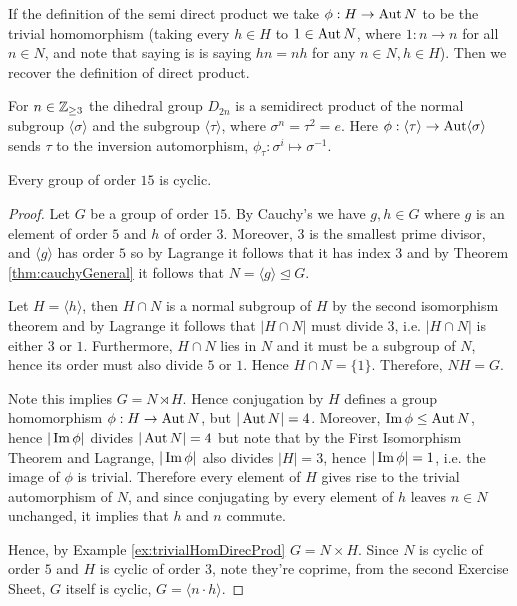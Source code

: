 \begin{example}
  If the definition of the semi direct product we take $\phi:H\to\operatorname{Aut} N$ to be the trivial
  homomorphism (taking every $h\in H$ to $1\in \operatorname{Aut} N$, where $1:n\to n$ for all $n\in
  N$, and note that saying is is saying $hn=nh$ for any $n\in N, h\in H$). Then we recover
  the definition of direct product.
  \label{ex:trivialHomDirecProd}
\end{example}

\begin{example}
  For $n\in\mathbb Z_{\geq 3}$ the dihedral group $D_{2n}$ is a semidirect product of the normal
  subgroup $\langle \sigma \rangle$ and the subgroup $\langle \tau \rangle$, where $\sigma
  ^n=\tau^2=e$. Here $\phi:\langle \tau \rangle\to \operatorname{Aut} \langle \sigma \rangle$ sends
  $\tau$ to the inversion automorphism, $\phi_{\tau}:\sigma^i\mapsto \sigma^{-1}$.
\end{example}

\begin{theorem}
  Every group of order $15$ is cyclic.
  \label{<+label+>}
\end{theorem}
\begin{proof}
  Let $G$ be a group of order $15$. By Cauchy's we have $g, h\in G$ where $g$ is an
  element of order $5$ and $h$ of order $3$. Moreover, $3$ is the smallest prime divisor,
  and $\langle g \rangle$ has order $5$ so by Lagrange it follows that it has index $3$
  and by Theorem \ref{thm:cauchyGeneral} it follows that $N=\langle g
  \rangle\trianglelefteq G$. 

  Let $H=\langle h \rangle$, then $H\cap N$ is a normal subgroup of
  $H$ by the second isomorphism theorem and by Lagrange it follows that $|H\cap N|$ must
  divide $3$, i.e. $|H\cap N|$ is either $3$ or $1$. Furthermore, $H\cap N$ lies in $N$
  and it must be a subgroup of $N$, hence its order must also divide $5$ or $1$. Hence
  $H\cap N=\{1\}$. Therefore, $NH=G$. 

  Note this implies $G= N\rtimes H$. Hence conjugation by $H$
  defines a group homomorphism $\phi:H\to\operatorname{Aut} N$, but $|\operatorname{Aut} N|=4$. Moreover, $\operatorname{Im}\phi
  \leq \operatorname{Aut} N$, hence $|\operatorname{Im}\phi|$ divides $|\operatorname{Aut} N|=4$ but note that by the First
  Isomorphism Theorem and Lagrange, $|\operatorname{Im} \phi|$ also divides $|H|=3$, hence
  $|\operatorname{Im}\phi|=1$, i.e. the image of $\phi$ is trivial. Therefore every element of $H$
  gives rise to the trivial automorphism of $N$, and since conjugating by every element of
  $h$ leaves $n\in N$ unchanged, it implies that $h$ and $n$ commute.

  Hence, by Example \ref{ex:trivialHomDirecProd} $G=N\times H$. Since $N$ is cyclic of
  order $5$ and $H$ is cyclic of order $3$, note they're coprime, from the second Exercise
  Sheet, $G$ itself is cyclic, $G=\langle n\cdot h \rangle$.
\end{proof}

